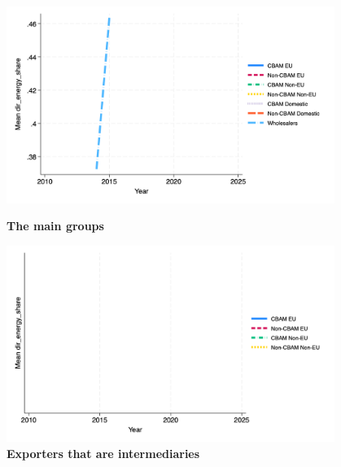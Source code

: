 \documentclass{article}
\begin{document}
\begin{figure}[H]
\centering
\includegraphics[width=0.95\textwidth]{dir_energy_share_main_groups.png}
\caption{\textbf{The main groups}}
\includegraphics[width=0.95\textwidth]{dir_energy_share_ei.png}
\caption{\textbf{Exporters that are intermediaries}}
\end{figure}
\end{document}
